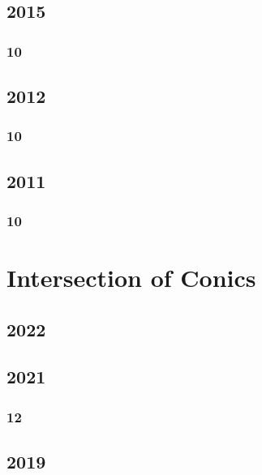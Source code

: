 \documentclass[11pt]{book}
\begin{document}
\section{2015}
\subsection{10}




\section{2012}
\subsection{10}


\section{2011}
\subsection{10}



%


\chapter{Intersection of Conics}
\section{2022}

\section{2021}
\subsection{12}

\section{2019}
\end{document}
